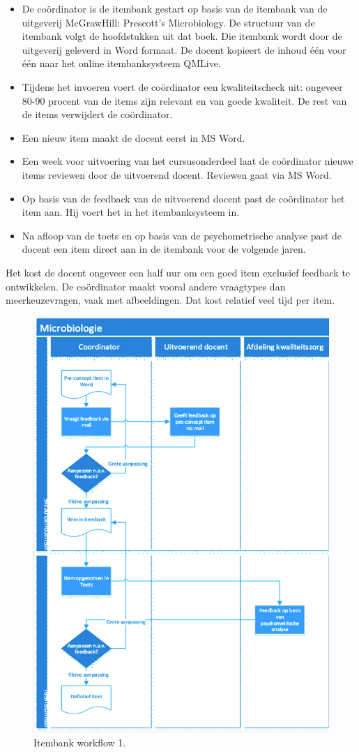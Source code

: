 \documentclass[
]{book}
\providecommand{\tightlist}{%
  \setlength{\itemsep}{0pt}\setlength{\parskip}{0pt}}
\begin{document}
\begin{itemize}
\tightlist
\item
  De coördinator is de itembank gestart op basis van de itembank van de uitgeverij McGrawHill: Prescott's Microbiology. De structuur van de itembank volgt de hoofdstukken uit dat boek. Die itembank wordt door de uitgeverij geleverd in Word formaat. De docent kopieert de inhoud één voor één naar het online itembanksysteem QMLive.
\item
  Tijdens het invoeren voert de coördinator een kwaliteitscheck uit: ongeveer 80-90 procent van de items zijn relevant en van goede kwaliteit. De rest van de items verwijdert de coördinator.
\item
  Een nieuw item maakt de docent eerst in MS Word.
\item
  Een week voor uitvoering van het cursusonderdeel laat de coördinator nieuwe items reviewen door de uitvoerend docent. Reviewen gaat via MS Word.
\item
  Op basis van de feedback van de uitvoerend docent past de coördinator het item aan. Hij voert het in het itembanksysteem in.
\item
  Na afloop van de toets en op basis van de psychometrische analyse past de docent een item direct aan in de itembank voor de volgende jaren.
\end{itemize}

Het kost de docent ongeveer een half uur om een goed item exclusief feedback te ontwikkelen. De coördinator maakt vooral andere vraagtypes dan meerkeuzevragen, vaak met afbeeldingen. Dat kost relatief veel tijd per item.

\begin{figure}
\includegraphics[width=0.6\linewidth]{images/microbio} \caption{Itembank workflow 1.}\label{fig:unnamed-chunk-11}
\end{figure}
\end{document}
